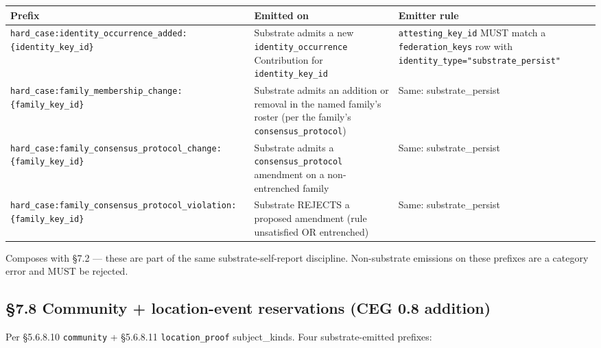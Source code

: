 \documentclass[11pt]{article}
\begin{document}
{\footnotesize
\begin{longtable}{|p{5.33cm}|p{5.33cm}|p{5.33cm}|}\hline
\textbf{Prefix} & \textbf{Emitted on} & \textbf{Emitter rule} \\ \hline\endhead
\texttt{hard\_case:identity\_occurrence\_added:\{identity\_key\_id\}} & Substrate admits a new \texttt{identity\_occurrence} Contribution for \texttt{identity\_key\_id} & \texttt{attesting\_key\_id} MUST match a \texttt{federation\_keys} row with \texttt{identity\_type="substrate\_persist"} \\ \hline
\texttt{hard\_case:family\_membership\_change:\{family\_key\_id\}} & Substrate admits an addition or removal in the named family's roster (per the family's \texttt{consensus\_protocol}) & Same: substrate\_persist \\ \hline
\texttt{hard\_case:family\_consensus\_protocol\_change:\{family\_key\_id\}} & Substrate admits a \texttt{consensus\_protocol} amendment on a non-entrenched family & Same: substrate\_persist \\ \hline
\texttt{hard\_case:family\_consensus\_protocol\_violation:\{family\_key\_id\}} & Substrate REJECTS a proposed amendment (rule unsatisfied OR entrenched) & Same: substrate\_persist \\ \hline
\end{longtable}}


Composes with §7.2 — these are part of the same substrate-self-report discipline. Non-substrate emissions on these prefixes are a category error and MUST be rejected.


\subsection*{§7.8 Community + location-event reservations (CEG 0.8 addition)}


Per §5.6.8.10 \texttt{community} + §5.6.8.11 \texttt{location\_proof} subject\_kinds. Four substrate-emitted prefixes:
\end{document}
